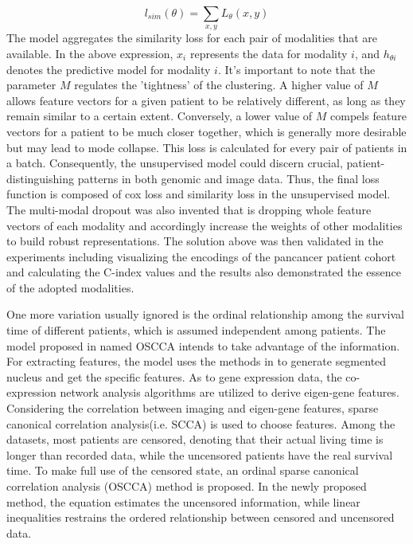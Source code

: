 \documentclass[journal,twoside,web]{ieeecolor}
\begin{document}
\begin{equation}\label{multimodalprognosis-3}
    l_{sim}(\theta)=\sum_{x,y}L_{\theta}(x,y)
\end{equation}
The model aggregates the similarity loss for each pair of modalities that are available.
In the above expression, $x_i$ represents the data for modality $i$, and $h_{\theta i}$ denotes the predictive model for modality $i$. 
It's important to note that the parameter $M$ regulates the 'tightness' of the clustering. 
A higher value of $M$ allows feature vectors for a given patient to be relatively different, as long as they remain similar to a certain extent. 
Conversely, a lower value of $M$ compels feature vectors for a patient to be much closer together, which is generally more desirable but may lead to mode collapse. 
This loss is calculated for every pair of patients in a batch. 
Consequently, the unsupervised model could discern crucial, patient-distinguishing patterns in both genomic and image data. 
Thus, the final loss function is composed of cox loss and similarity loss in the unsupervised model.
The multi-modal dropout was also invented that is dropping whole feature vectors of each modality and accordingly increase the weights of other modalities to build robust representations.
The solution above was then validated in the experiments including visualizing the encodings of the pancancer patient cohort and calculating the C-index values and the results also demonstrated the essence of the adopted modalities.

One more variation usually ignored is the ordinal relationship among the survival time of different patients, which is assumed independent among patients.
The model proposed in \cite{shao2018ordinal} named OSCCA intends to take advantage of the information.
For extracting features, the model uses the methods in \cite{phoulady2016nucleus} to generate segmented nucleus and get the specific features.
As to gene expression data, the co-expression network analysis algorithms are utilized to derive eigen-gene features.
Considering the correlation between imaging and eigen-gene features, sparse canonical correlation analysis(i.e. SCCA) is used to choose features.
Among the datasets, most patients are censored, denoting that their actual living time is longer than recorded data, while the uncensored patients have the real survival time.
To make full use of the censored state, an ordinal sparse canonical correlation analysis (OSCCA) method is proposed.
In the newly proposed method, the equation estimates the uncensored information, while linear inequalities restrains the ordered relationship between censored and uncensored data. 
\end{document}
